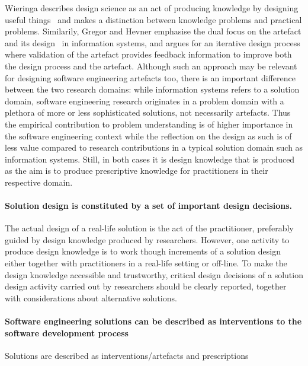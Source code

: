 \documentclass[graybox]{svmult}
\begin{document}
{Wieringa describes design science as an act of producing knowledge by designing useful things~\cite{wieringa_design_2009} and makes a distinction between knowledge problems and practical problems. Similarily, Gregor and Hevner emphasise the dual focus on the artefact and its design~\cite{gregor_positioning_2013} in information systems, and argues for an iterative design process where validation of the artefact provides feedback information to improve both the design process and the artefact. Although such an approach may be relevant for designing software engineering artefacts too, there is an important difference between the two research domains: while information systems refers to a solution domain, software engineering research originates in a problem domain with a plethora of more or less sophisticated solutions, not necessarily artefacts. Thus the empirical contribution to problem understanding is of higher importance in the software engineering context while the reflection on the design as such is of less value compared to research contributions in a typical solution domain such as information systems. Still, in both cases it is design knowledge that is produced as the aim is to produce prescriptive knowledge for practitioners in their respective domain. 

\paragraph{Solution design is constituted by a set of important design decisions.}  The actual design of a real-life solution is the act of the practitioner, preferably guided by design knowledge produced by researchers. However, one activity to produce design knowledge is to work though increments of a solution design either together with practitioners in a real-life setting or off-line. To make the design knowledge accessible and trustworthy, critical design decisions of a solution design activity carried out by researchers should be clearly reported, together with considerations about alternative solutions. 

\paragraph{Software engineering solutions can be described as interventions to the software development process}
Solutions are described as interventions/artefacts and prescriptions



}
\end{document}
